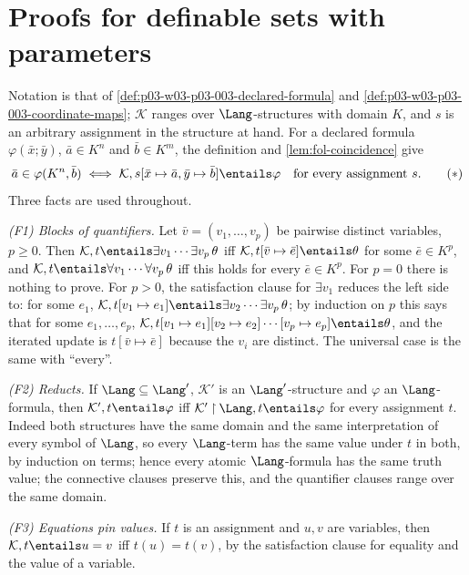 \section{Proofs for definable sets with parameters}
\label{sec:annex-p03-w03-p03-003-definable-sets}

Notation is that of \cref{def:p03-w03-p03-003-declared-formula} and
\cref{def:p03-w03-p03-003-coordinate-maps}; \(\mathcal K\) ranges over
\(\Lang\)-structures with domain \(K\), and \(s\) is an arbitrary assignment
in the structure at hand.  For a declared formula \(\varphi(\bar x;\bar y)\),
\(\bar a\in K^n\) and \(\bar b\in K^m\), the definition and
\cref{lem:fol-coincidence} give
\[
 \bar a\in\varphi(K^n,\bar b)
 \iff
 \mathcal K,s[\bar x\mapsto\bar a,\bar y\mapsto\bar b]\entails\varphi
 \quad\text{for every assignment }s.
 \tag{\(\ast\)}
\]
Three facts are used throughout.

\emph{(F1) Blocks of quantifiers.}  Let \(\bar v=(v_1,\ldots,v_p)\) be
pairwise distinct variables, \(p\geq0\).  Then
\(\mathcal K,t\entails\exists v_1\cdots\exists v_p\,\theta\) iff
\(\mathcal K,t[\bar v\mapsto\bar e]\entails\theta\) for some
\(\bar e\in K^p\), and \(\mathcal K,t\entails\forall v_1\cdots\forall
v_p\,\theta\) iff this holds for every \(\bar e\in K^p\).  For \(p=0\) there
is nothing to prove.  For \(p>0\), the satisfaction clause for
\(\exists v_1\) reduces the left side to: for some \(e_1\),
\(\mathcal K,t[v_1\mapsto e_1]\entails\exists v_2\cdots\exists v_p\,\theta\);
by induction on \(p\) this says that for some \(e_1,\ldots,e_p\),
\(\mathcal K,t[v_1\mapsto e_1][v_2\mapsto e_2]\cdots[v_p\mapsto e_p]
\entails\theta\), and the iterated update is \(t[\bar v\mapsto\bar e]\)
because the \(v_i\) are distinct.  The universal case is the same with
``every''.

\emph{(F2) Reducts.}  If \(\Lang\subseteq\Lang'\), \(\mathcal K'\) is an
\(\Lang'\)-structure and \(\varphi\) an \(\Lang\)-formula, then
\(\mathcal K',t\entails\varphi\) iff
\(\mathcal K'\mathbin{\upharpoonright}\Lang,t\entails\varphi\) for every
assignment \(t\).  Indeed both structures have the same domain and the same
interpretation of every symbol of \(\Lang\), so every \(\Lang\)-term has the
same value under \(t\) in both, by induction on terms; hence every atomic
\(\Lang\)-formula has the same truth value; the connective clauses preserve
this, and the quantifier clauses range over the same domain.

\emph{(F3) Equations pin values.}  If \(t\) is an assignment and \(u,v\) are
variables, then \(\mathcal K,t\entails u=v\) iff \(t(u)=t(v)\), by the
satisfaction clause for equality and the value of a variable.

